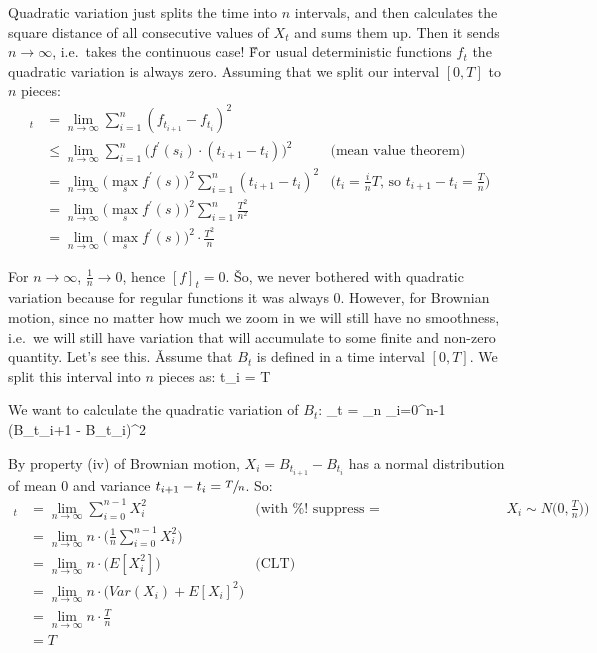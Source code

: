 Quadratic variation just splits the time into $n$ intervals, and then calculates the square distance of all
consecutive values of $X_{t}$ and sums them up. Then it sends $n \to \infty$, i.e.\ takes the continuous case! \v

For usual deterministic functions $f_{t}$ the quadratic variation is always zero. Assuming that we split our
interval $[0, T]$ to $n$ pieces:
\begin{align*}
[f]_{t} &= \lim_{n \to \infty} \sum_{i=1}^{n} (f_{t_{i+1}} - f_{t_{i}})^{2} \\
&\leq \lim_{n \to \infty} \sum_{i=1}^{n} \Big( f^{\prime}(s_{i}) \cdot (t_{i+1} - t_{i}) \Big)^{2}
& \text{(mean value theorem)} \\
&= \lim_{n \to \infty} \Big( \max_{s} f^{\prime}(s) \Big)^{2} \sum_{i=1}^{n} (t_{i+1} - t_{i})^{2}
& \text{($t_{i} = \frac{i}{n} T$, so $t_{i+1} - t_{i} = \frac{T}{n}$)} \\
&= \lim_{n \to \infty} \Big( \max_{s} f^{\prime}(s) \Big)^{2} \sum_{i=1}^{n} \frac{T^{2}}{n^{2}} \\
&= \lim_{n \to \infty} \Big( \max_{s} f^{\prime}(s) \Big)^{2} \cdot \frac{T^{2}}{n}
\end{align*}

For $n \to \infty$, $\frac{1}{n} \to 0$, hence $[f]_{t} = 0$. \v

So, we never bothered with quadratic variation because for regular functions it was always 0. However, for Brownian
motion, since no matter how much we zoom in we will still have no smoothness, i.e.\ we will still have variation
that will accumulate to some finite and non-zero quantity. Let's see this. \v

Assume that $B_{t}$ is defined in a time interval $[0, T]$. We split this interval into $n$ pieces as:
\bse
t_{i} =  \cdot T
\ese

We want to calculate the quadratic variation of $B_{t}$:
\bse
[B]_{t} = \lim_{n \to \infty} \sum_{i=0}^{n-1} (B_{t_{i+1}} - B_{t_{i}})^{2}
\ese

By property (iv) of Brownian motion, $X_{i} = B_{t_{i+1}} - B_{t_{i}}$ has a normal distribution of mean 0 and
variance $t_{i+1} - t_{i} = \sfrac{T}{n}$. So:
\begin{align*}
[B]_{t} &= \lim_{n \to \infty} \sum_{i=0}^{n-1} X_{i}^{2}
& \text{(with %
$X_{i} \sim N \big(0, \frac{T}{n}\big)$)} \\
&= \lim_{n \to \infty} n \cdot \Big( \frac{1}{n} \sum_{i=0}^{n-1} X_{i}^{2} \Big) \\
&= \lim_{n \to \infty} n \cdot \Big( E[X_{i}^{2}] \Big)
& \text{(CLT)} \\
&= \lim_{n \to \infty} n \cdot \Big( Var(X_{i}) + E[X_{i}]^{2} \Big) \\
&= \lim_{n \to \infty} n \cdot \frac{T}{n} \\
&= T
\end{align*}

